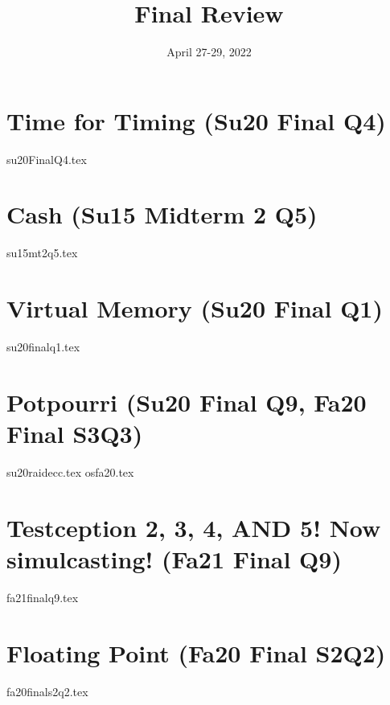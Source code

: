 \documentclass[11pt]{exam}
\title{Final Review}
\date{April 27-29, 2022}
\begin{document}
\maketitle

\section{Time for Timing (Su20 Final Q4)}
\begin{questions}
{su20FinalQ4.tex}
\end{questions}
\newpage

\section{Cash (Su15 Midterm 2 Q5)}
\begin{questions}
{su15mt2q5.tex}
\end{questions}
\newpage 

\section{Virtual Memory (Su20 Final Q1)}
\begin{questions}
{su20finalq1.tex}
\end{questions}
\newpage 

\section{Potpourri (Su20 Final Q9, Fa20 Final S3Q3)}
\begin{questions}
{su20raidecc.tex}
{osfa20.tex}
\end{questions}
\newpage

\section{Testception 2, 3, 4, AND 5! Now simulcasting! (Fa21 Final Q9)}
\begin{questions}
{fa21finalq9.tex}
\end{questions}
\newpage

\section{Floating Point (Fa20 Final S2Q2)}
\begin{questions}
{fa20finals2q2.tex}
\end{questions}
\newpage 
\end{document}
